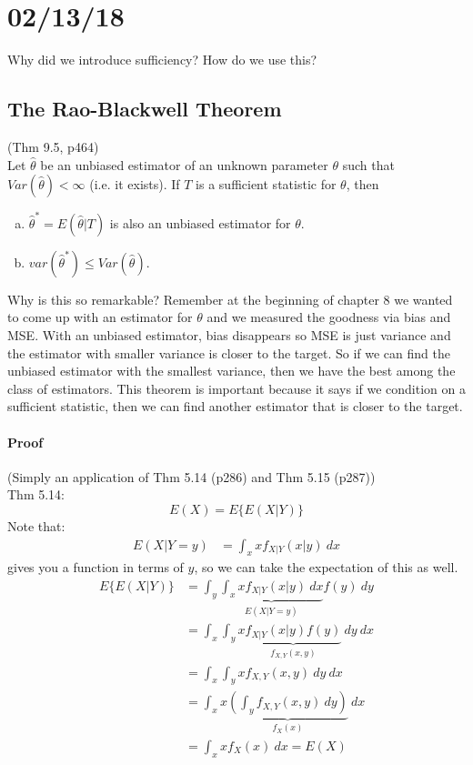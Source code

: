 \documentclass[12 pt]{article}
\begin{document}
  \section{02/13/18}
  Why did we introduce sufficiency? How do we use this?
  \subsection{The Rao-Blackwell Theorem}
  (Thm 9.5, p464)
  \\ Let $\hat{\theta}$ be an unbiased estimator of an unknown
  parameter $\theta$ such that $Var(\hat{\theta}) < \infty$ (i.e. it
  exists). If $T$ is a sufficient statistic for $\theta$, then
  \begin{enumerate}[a)]
  \item $\hat{\theta}^* = E(\hat{\theta} | T)$ is also an unbiased
    estimator for $\theta$.
  \item $var(\hat{\theta}^*)\leq Var(\hat{\theta})$.
  \end{enumerate}
  Why is this so remarkable? Remember at the beginning of chapter 8 we
  wanted to come up with an estimator for $\theta$ and we measured the
  goodness via bias and MSE. With an unbiased estimator, bias
  disappears so MSE is just variance and the estimator with smaller
  variance is closer to the target. So if we can find the unbiased estimator
  with the smallest variance, then we have the best among the class of
  estimators. This theorem is important because it says if we
  condition on a sufficient statistic, then we can find another
  estimator that is closer to the target.
  \paragraph{Proof} (Simply an application of Thm 5.14 (p286) and Thm
  5.15 (p287))
  \\ Thm 5.14:
  \begin{equation}
    \label{eq:5.14}
    E(X) = E\{E(X|Y)\}
  \end{equation}
  Note that:
  \begin{align*}
    E(X|Y=y) & = \int_x x f_{X|Y} (x|y) \ dx
  \end{align*}
  gives you a function in terms of $y$, so we can take the expectation
  of this as well.
  \begin{align*}
    E\{E(X|Y)\} & = \int_y \underbrace{\int_x x f_{X|Y}(x|y) \ dx}_{E(X|Y=y)}f(y) \ dy
    \\ & = \int_x \int_y x \underbrace{f_{X|Y} (x|y) f(y)}_{f_{X,Y}(x,y)} \ dy \ dx
    \\ & = \int_x \int_y x f_{X,Y}(x,y) \ dy \ dx
    \\ & = \int_x x \underbrace{(\int_y f_{X,Y}(x,y) \ dy)}_{f_X(x)} \ dx
    \\ & = \int_x x f_X(x) \ dx = E(X)
  \end{align*}
  
\end{document}
